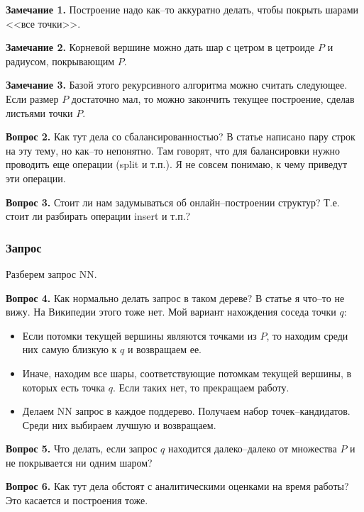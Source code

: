\documentclass{article}
\begin{document}
                {\bf Замечание 1.} Построение надо как--то аккуратно делать, чтобы покрыть шарами <<все точки>>.                
                
                {\bf Замечание 2.} Корневой вершине можно дать шар с цетром в цетроиде $P$ и радиусом, покрывающим $P$.
                
                {\bf Замечание 3.} Базой этого рекурсивного алгоритма можно считать следующее. Если размер $P$ достаточно мал, то можно закончить текущее построение, сделав листьями точки $P$.
               
                {\bf Вопрос 2.} Как тут дела со сбалансированностью? В статье написано пару строк на эту тему, но как--то непонятно. Там говорят, что для балансировки нужно проводить еще операции (split и т.п.). Я не совсем понимаю, к чему приведут эти операции.                
                
                {\bf Вопрос 3.} Стоит ли нам задумываться об онлайн--построении структур? Т.е. стоит ли разбирать операции insert и т.п.?
                
            \subsubsection{Запрос}
                Разберем запрос NN. 
                
                {\bf Вопрос 4.} Как нормально делать запрос в таком дереве? В статье я что--то не вижу. На Википедии этого тоже нет.
                Мой вариант нахождения соседа точки $q$: 
                \begin{itemize}
                    \item Если потомки текущей вершины являются точками из $P$, то находим среди них самую близкую к $q$ и возвращаем ее.
                    \item Иначе, находим все шары, соответствующие потомкам текущей вершины, в которых есть точка $q$. Если таких нет, то прекращаем работу.  
                    \item Делаем NN запрос в каждое поддерево. Получаем набор точек--кандидатов. Среди них выбираем лучшую и возвращаем.
                \end{itemize}     
                
                {\bf Вопрос 5.} Что делать, если запрос $q$ находится далеко--далеко от множества $P$ и не покрывается ни одним шаром?
                
                {\bf Вопрос 6.} Как тут дела обстоят с аналитическими оценками на время работы? Это касается и построения тоже.
                
\end{document}
